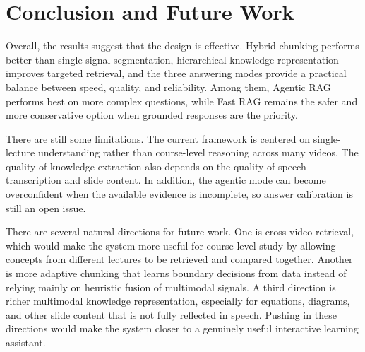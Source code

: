 \section{Conclusion and Future Work}

Overall, the results suggest that the design is effective. Hybrid chunking performs better than single-signal segmentation, hierarchical knowledge representation improves targeted retrieval, and the three answering modes provide a practical balance between speed, quality, and reliability. Among them, Agentic RAG performs best on more complex questions, while Fast RAG remains the safer and more conservative option when grounded responses are the priority.

There are still some limitations. The current framework is centered on single-lecture understanding rather than course-level reasoning across many videos. The quality of knowledge extraction also depends on the quality of speech transcription and slide content. In addition, the agentic mode can become overconfident when the available evidence is incomplete, so answer calibration is still an open issue.

There are several natural directions for future work. One is cross-video retrieval, which would make the system more useful for course-level study by allowing concepts from different lectures to be retrieved and compared together. Another is more adaptive chunking that learns boundary decisions from data instead of relying mainly on heuristic fusion of multimodal signals. A third direction is richer multimodal knowledge representation, especially for equations, diagrams, and other slide content that is not fully reflected in speech. Pushing in these directions would make the system closer to a genuinely useful interactive learning assistant.
